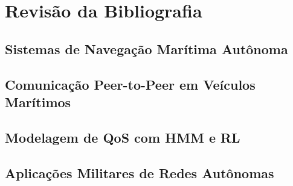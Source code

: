 \section{Revisão da Bibliografia}

\subsection{Sistemas de Navegação Marítima Autônoma}

\subsection{Comunicação Peer-to-Peer em Veículos Marítimos}

\subsection{Modelagem de QoS com HMM e RL}

\subsection{Aplicações Militares de Redes Autônomas}

